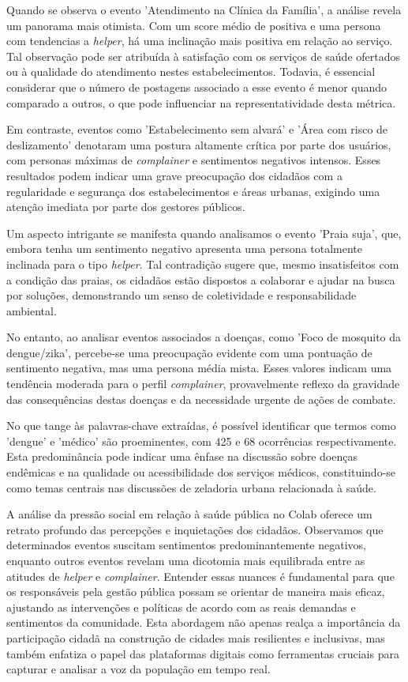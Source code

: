 Quando se observa o evento 'Atendimento na Clínica da Família', a análise revela um panorama mais otimista. Com um score médio de positiva e uma persona com tendencias a \textit{helper}, há uma inclinação mais positiva em relação ao serviço. Tal observação pode ser atribuída à satisfação com os serviços de saúde ofertados ou à qualidade do atendimento nestes estabelecimentos. Todavia, é essencial considerar que o número de postagens associado a esse evento é menor quando comparado a outros, o que pode influenciar na representatividade desta métrica.

Em contraste, eventos como 'Estabelecimento sem alvará' e 'Área com risco de deslizamento' denotaram uma postura altamente crítica por parte dos usuários, com personas máximas de \textit{complainer} e sentimentos negativos intensos. Esses resultados podem indicar uma grave preocupação dos cidadãos com a regularidade e segurança dos estabelecimentos e áreas urbanas, exigindo uma atenção imediata por parte dos gestores públicos.

Um aspecto intrigante se manifesta quando analisamos o evento 'Praia suja', que, embora tenha um sentimento negativo apresenta uma persona totalmente inclinada para o tipo \textit{helper}. Tal contradição sugere que, mesmo insatisfeitos com a condição das praias, os cidadãos estão dispostos a colaborar e ajudar na busca por soluções, demonstrando um senso de coletividade e responsabilidade ambiental.

No entanto, ao analisar eventos associados a doenças, como 'Foco de mosquito da dengue/zika', percebe-se uma preocupação evidente com uma pontuação de sentimento negativa, mas uma persona média mista. Esses valores indicam uma tendência moderada para o perfil \textit{complainer}, provavelmente reflexo da gravidade das consequências destas doenças e da necessidade urgente de ações de combate.

No que tange às palavras-chave extraídas, é possível identificar que termos como 'dengue' e 'médico' são proeminentes, com 425 e 68 ocorrências respectivamente. Esta predominância pode indicar uma ênfase na discussão sobre doenças endêmicas e na qualidade ou acessibilidade dos serviços médicos, constituindo-se como temas centrais nas discussões de zeladoria urbana relacionada à saúde.

A análise da pressão social em relação à saúde pública no Colab oferece um retrato profundo das percepções e inquietações dos cidadãos. Observamos que determinados eventos suscitam sentimentos predominantemente negativos, enquanto outros eventos revelam uma dicotomia mais equilibrada entre as atitudes de \textit{helper} e \textit{complainer}. Entender essas nuances é fundamental para que os responsáveis pela gestão pública possam se orientar de maneira mais eficaz, ajustando as intervenções e políticas de acordo com as reais demandas e sentimentos da comunidade. Esta abordagem não apenas realça a importância da participação cidadã na construção de cidades mais resilientes e inclusivas, mas também enfatiza o papel das plataformas digitais como ferramentas cruciais para capturar e analisar a voz da população em tempo real.

